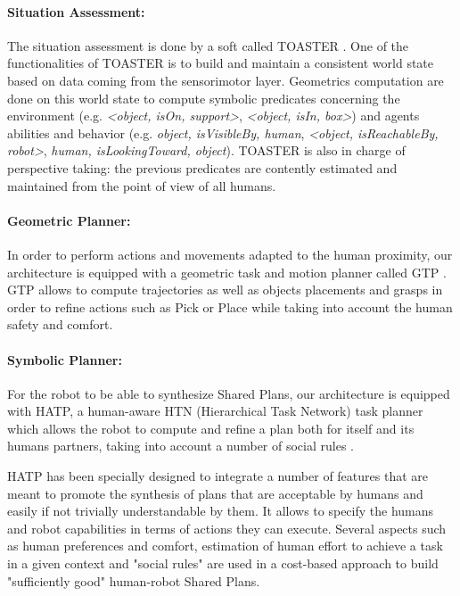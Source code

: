\documentclass[english,a4paper,11pt,twoside]{StyleThese}
\begin{document}
\paragraph{Situation Assessment:}
The situation assessment is done by a soft called TOASTER \cite{milliezThesis}. One of the functionalities of TOASTER is to build and maintain a consistent world state based on data coming from the sensorimotor layer. Geometrics computation are done on this world state to compute symbolic predicates concerning the environment (e.g. \textit{<object, isOn, support>}, \textit{<object, isIn, box>}) and agents abilities and behavior (e.g. \textit{object, isVisibleBy, human}, \textit{<object, isReachableBy, robot>}, \textit{human, isLookingToward, object}). TOASTER is also in charge of perspective taking: the previous predicates are contently estimated and maintained from the point of view of all humans.

\paragraph{Geometric Planner:}
In order to perform actions and movements adapted to the human proximity, our architecture is equipped with a geometric task and motion planner called GTP \cite{waldhart2016novel}. GTP allows to compute trajectories as well as objects placements and grasps in order to refine actions such as Pick or Place while taking into account the human safety and comfort.

\paragraph{Symbolic Planner:}
For the robot to be able to synthesize Shared Plans, our architecture is equipped with HATP, a human-aware HTN (Hierarchical Task Network) task planner which allows the robot to compute and refine a plan both for itself and its humans partners, taking into account a number of social rules \cite{Lallement2014hatp}.

HATP has been specially designed to integrate a number of features that are meant to promote the synthesis of plans that are acceptable by humans and easily if not trivially understandable by them. It allows to specify the humans and robot capabilities in terms of actions they can execute. Several aspects such as human preferences and comfort, estimation of human effort to achieve a task in a given context and "social rules" are used in a cost-based approach to build "sufficiently good" human-robot Shared Plans.
\end{document}
